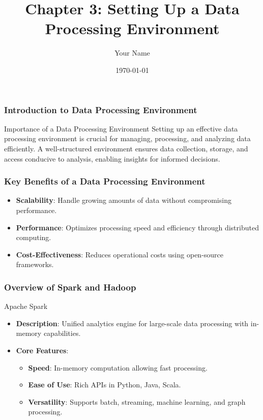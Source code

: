 \documentclass{beamer}
\title{Chapter 3: Setting Up a Data Processing Environment}
\author{Your Name}
\institute{Your Institution}
\date{\today}
\begin{document}
\frame{\titlepage}

\begin{frame}
    \frametitle{Introduction to Data Processing Environment}
    \begin{block}{Importance of a Data Processing Environment}
        Setting up an effective data processing environment is crucial for managing, processing, and analyzing data efficiently. 
        A well-structured environment ensures data collection, storage, and access conducive to analysis, enabling insights for informed decisions.
    \end{block}
\end{frame}

\begin{frame}
    \frametitle{Key Benefits of a Data Processing Environment}
    \begin{itemize}
        \item \textbf{Scalability}: Handle growing amounts of data without compromising performance.
        \item \textbf{Performance}: Optimizes processing speed and efficiency through distributed computing.
        \item \textbf{Cost-Effectiveness}: Reduces operational costs using open-source frameworks.
    \end{itemize}
\end{frame}

\begin{frame}
    \frametitle{Overview of Spark and Hadoop}
    \begin{block}{Apache Spark}
        \begin{itemize}
            \item \textbf{Description}: Unified analytics engine for large-scale data processing with in-memory capabilities.
            \item \textbf{Core Features}:
            \begin{itemize}
                \item \textbf{Speed}: In-memory computation allowing fast processing.
                \item \textbf{Ease of Use}: Rich APIs in Python, Java, Scala.
                \item \textbf{Versatility}: Supports batch, streaming, machine learning, and graph processing.
            \end{itemize}
        \end{itemize}
    \end{block}
\end{frame}
\end{document}
